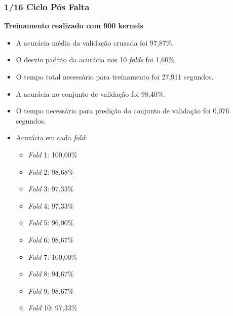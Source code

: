 \subsubsection{1/16 Ciclo Pós Falta}
\textbf{Treinamento realizado com 900 kernels}
\begin{itemize}
    \item A acurácia média da validação cruzada foi 97,87\%.
    \item O desvio padrão da acurácia nos 10 \textit{folds} foi 1,60\%.
    \item O tempo total necessário para treinamento foi 27,911 segundos.
    \item A acurácia no conjunto de validação foi 98,40\%.
    \item O tempo necessário para predição do conjunto de validação foi 0,076 segundos.
    \item Acurácia em cada \textit{fold}:
    \begin{itemize}
        \item \textit{Fold} 1: 100,00\%
        \item \textit{Fold} 2: 98,68\%
        \item \textit{Fold} 3: 97,33\%
        \item \textit{Fold} 4: 97,33\%
        \item \textit{Fold} 5: 96,00\%
        \item \textit{Fold} 6: 98,67\%
        \item \textit{Fold} 7: 100,00\%
        \item \textit{Fold} 8: 94,67\%
        \item \textit{Fold} 9: 98,67\%
        \item \textit{Fold} 10: 97,33\%
    \end{itemize}
\end{itemize}

